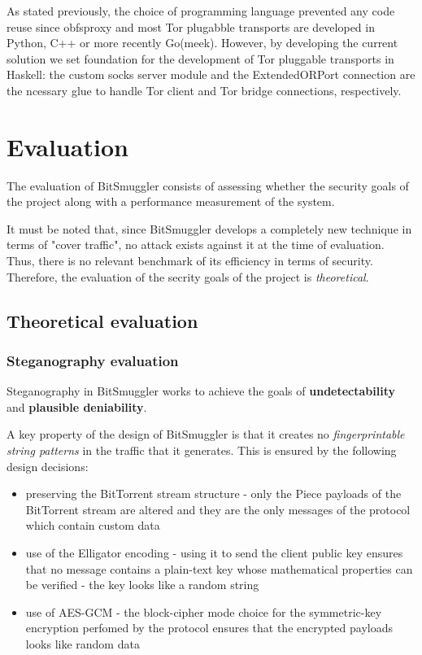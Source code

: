 \documentclass[11pt]{article} %
\newcommand{\projectName}{BitSmuggler }
\begin{document}
As stated previously, the choice of programming language prevented any code reuse since obfsproxy and most Tor plugabble transports are developed in Python, C++ or more recently Go(meek). However, by developing the current solution we set foundation for the development of Tor pluggable transports in Haskell: the custom socks server module and the ExtendedORPort connection are the ncessary glue to handle Tor client and Tor bridge connections, respectively.

\section{Evaluation}

The evaluation of \projectName consists of assessing whether the security goals of the project along with a performance measurement of the system.

It must be noted that, since \projectName develops a completely new technique in terms of "cover traffic", no attack exists against it at the time of evaluation. Thus, there is no relevant benchmark of its efficiency in terms of security. Therefore, the evaluation of the secrity goals of the project is \textit{theoretical}.

\subsection{Theoretical evaluation}

\subsubsection{Steganography evaluation}

Steganography in \projectName works to achieve the goals of \textbf{undetectability} and \textbf{plausible deniability}.

A key property of the design of \projectName is that it creates no \textit{fingerprintable string patterns} in the traffic that it generates. This is ensured by the following design decisions:
\begin{itemize}
\item preserving the BitTorrent stream structure - only the Piece payloads of the BitTorrent stream are altered and they are the only messages of the protocol which contain custom data
\item use of the Elligator encoding - using it to send the client public key ensures that no message contains a plain-text key whose mathematical properties can be verified - the key looks like a random string
\item use of AES-GCM - the block-cipher mode choice for the symmetric-key encryption perfomed by the protocol ensures that the encrypted payloads looks like random data
\end{itemize}
\end{document}
